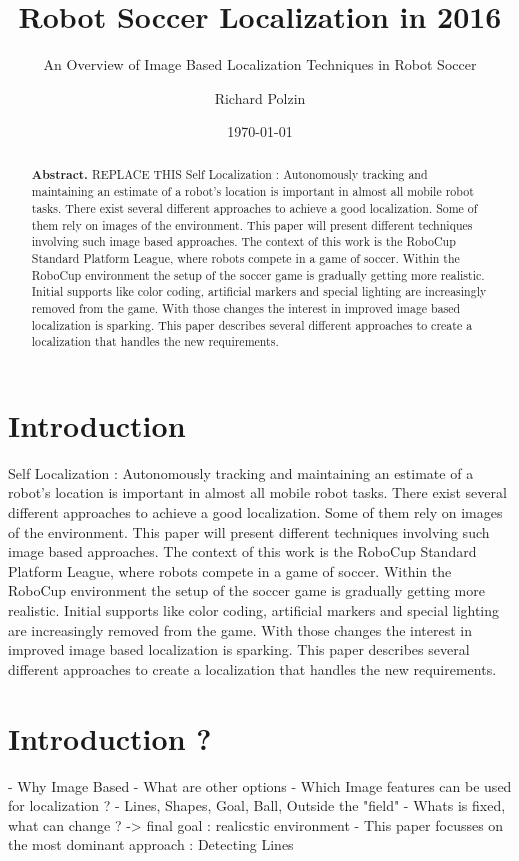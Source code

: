 \documentclass[12pt, a4paper]{scrartcl}
\author{Richard Polzin}
\title{Robot Soccer Localization in 2016}
\subtitle{An Overview of Image Based Localization Techniques in Robot Soccer}
\date{\today}
\begin{document}
  \maketitle

  \begin{abstract}
    \textbf{Abstract.} REPLACE THIS Self Localization : Autonomously tracking and maintaining an estimate of a robot's location is important in almost all mobile robot tasks. There exist several different approaches to achieve a good localization. Some of them rely on images of the environment. This paper will present different techniques involving such image based approaches. The context of this work is the RoboCup Standard Platform League, where robots compete in a game of soccer. Within the RoboCup environment the setup of the soccer game is gradually getting more realistic. Initial supports like color coding, artificial markers and special lighting are increasingly removed from the game. With those changes the interest in improved image based localization is sparking. This paper describes several different approaches to create a localization that handles the new requirements.
  \end{abstract}

  \section{Introduction}
  Self Localization : Autonomously tracking and maintaining an estimate of a robot's location is important in almost all mobile robot tasks. There exist several different approaches to achieve a good localization. Some of them rely on images of the environment. This paper will present different techniques involving such image based approaches. The context of this work is the RoboCup Standard Platform League, where robots compete in a game of soccer. Within the RoboCup environment the setup of the soccer game is gradually getting more realistic. Initial supports like color coding, artificial markers and special lighting are increasingly removed from the game. With those changes the interest in improved image based localization is sparking. This paper describes several different approaches to create a localization that handles the new requirements.

  \section{Introduction ?}
  - Why Image Based
    - What are other options
  - Which Image features can be used for localization ?
    - Lines, Shapes, Goal, Ball, Outside the "field"
      - Whats is fixed, what can change ? -> final goal : realicstic environment
      - This paper focusses on the most dominant approach : Detecting Lines
\end{document}
